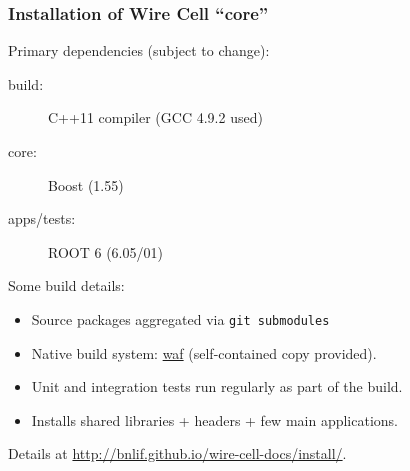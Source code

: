\documentclass[xcolor=dvipsnames]{beamer}
\begin{document}
\begin{frame}
  \frametitle{Installation of Wire Cell ``core''}

  Primary dependencies (subject to change):
  \begin{description}
  \item[build:] C++11 compiler (GCC 4.9.2 used)
  \item[core:] Boost (1.55)
  \item[apps/tests:] ROOT 6 (6.05/01)
  \end{description}

  \vspace{5mm}

  Some build details:
  \begin{itemize}
  \item Source packages aggregated via \texttt{git submodules}
  \item Native build system: \href{https://waf.io/}{waf}
    (self-contained copy provided).
  \item Unit and integration tests run regularly as part of the build.
  \item Installs shared libraries + headers + few main applications.
  \end{itemize}
  
  \vspace{5mm}
  \scriptsize
  Details at \url{http://bnlif.github.io/wire-cell-docs/install/}.
\end{frame}
\end{document}
